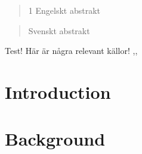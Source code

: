 \documentclass[a4paper, 12pt]{article}
\begin{document}
\begin{abstract}1
    Engelskt abstrakt
\end{abstract}

\bigskip

\bigskip

\bigskip

\bigskip

\begin{otherlanguage}{swedish}
\begin{abstract}
    Svenskt abstrakt
  
\end{abstract}
\end{otherlanguage}


\newpage
\tableofcontents
\newpage
{}

Test! Här är några relevant källor! \cite{NHQC},\cite{morris},\cite{qudit}

\section{Introduction}
%

\section{Background}


\newpage




\appendix
\end{document}
